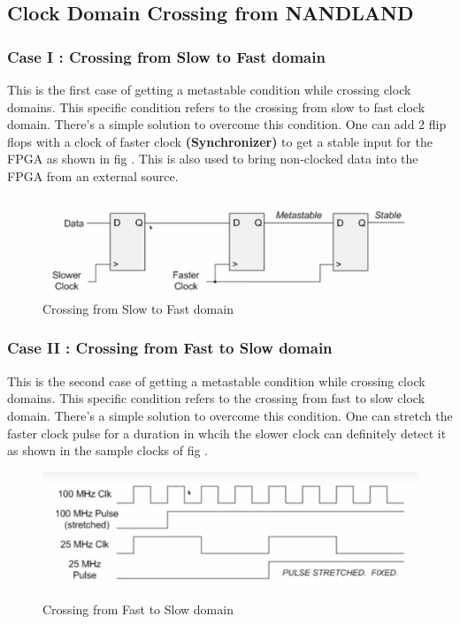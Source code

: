 \subsection{Clock Domain Crossing from NANDLAND}


\subsubsection{Case I : Crossing from Slow to Fast domain}
This is the first case of getting a metastable condition while crossing clock domains. This specific condition refers to the crossing from slow to fast clock domain. There's a simple solution to overcome this condition. One can add 2 flip flops with a clock of faster clock \textbf{(Synchronizer)} to get a stable input for the FPGA as shown in fig . This is also used to bring non-clocked data into the FPGA from an external source.

\begin{figure}[H]
	\begin{center}
		\includegraphics[width=5in]{images/SlowToFastCDC.png}
		\caption{Crossing from Slow to Fast domain}
		\label{SlowToFastCDC}
	\end{center}
\end{figure}


\subsubsection{Case II : Crossing from Fast to Slow domain}
This is the second case of getting a metastable condition while crossing clock domains. This specific condition refers to the crossing from fast to slow clock domain. There's a simple solution to overcome this condition. One can stretch the faster clock pulse for a duration in whcih the slower clock can definitely detect it as shown in the sample clocks of fig . 

\begin{figure}[H]
	\begin{center}
		\includegraphics[width=5in]{images/FastToSlowCDC.png}
		\caption{Crossing from Fast to Slow domain}
		\label{FastToSlowCDC}
	\end{center}
\end{figure}

